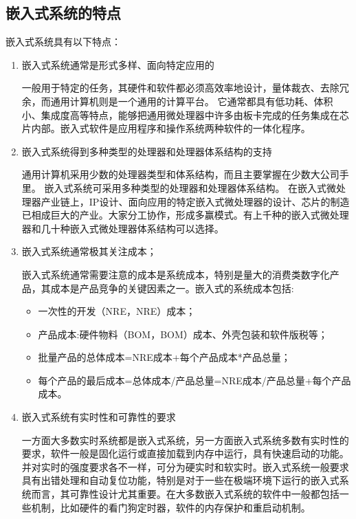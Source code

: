 \subsection{嵌入式系统的特点}
嵌入式系统具有以下特点：
\begin{enumerate}
\item 嵌入式系统通常是形式多样、面向特定应用的

一般用于特定的任务，其硬件和软件都必须高效率地设计，量体裁衣、去除冗余，而通用计算机则是一个通用的计算平台。 它通常都具有低功耗、体积小、集成度高等特点，能够把通用微处理器中许多由板卡完成的任务集成在芯片内部。嵌入式软件是应用程序和操作系统两种软件的一体化程序。

\item 嵌入式系统得到多种类型的处理器和处理器体系结构的支持

通用计算机采用少数的处理器类型和体系结构，而且主要掌握在少数大公司手里。 嵌入式系统可采用多种类型的处理器和处理器体系结构。
在嵌入式微处理器产业链上，IP设计、面向应用的特定嵌入式微处理器的设计、芯片的制造已相成巨大的产业。大家分工协作，形成多赢模式。有上千种的嵌入式微处理器和几十种嵌入式微处理器体系结构可以选择。

\item 嵌入式系统通常极其关注成本；

嵌入式系统通常需要注意的成本是系统成本，特别是量大的消费类数字化产品，其成本是产品竞争的关键因素之一。嵌入式的系统成本包括:
\begin{itemize}
\item 一次性的开发（\acrlong{NRE}，\acrshort{NRE}）成本；
\item 产品成本:硬件物料（\acrlong{BOM}，\acrshort{BOM}）成本、外壳包装和软件版税等；
\item 批量产品的总体成本=NRE成本+每个产品成本*产品总量；
\item 每个产品的最后成本=总体成本/产品总量=NRE成本/产品总量+每个产品成本。
\end{itemize}

\item 嵌入式系统有实时性和可靠性的要求

一方面大多数实时系统都是嵌入式系统，另一方面嵌入式系统多数有实时性的要求，软件一般是固化运行或直接加载到内存中运行，具有快速启动的功能。并对实时的强度要求各不一样，可分为硬实时和软实时。嵌入式系统一般要求具有出错处理和自动复位功能，特别是对于一些在极端环境下运行的嵌入式系统而言，其可靠性设计尤其重要。在大多数嵌入式系统的软件中一般都包括一些机制，比如硬件的看门狗定时器，软件的内存保护和重启动机制。


\end{enumerate}
